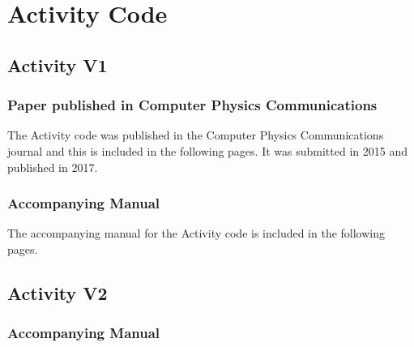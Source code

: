\chapter{Activity Code}

\section{Activity V1}

\subsection{Paper published in Computer Physics Communications}
\label{section:activityv1published}

The Activity code was published in the Computer Physics Communications journal and this is included in the following pages.  It was submitted in 2015 and published in 2017.

\clearpage



\FloatBarrier

\subsection{Accompanying Manual}
\label{section:activityv1manual}

The accompanying manual for the Activity code is included in the following pages.

\clearpage




\section{Activity V2}

\FloatBarrier
\subsection{Accompanying Manual}
\label{section:activityv2manual}





